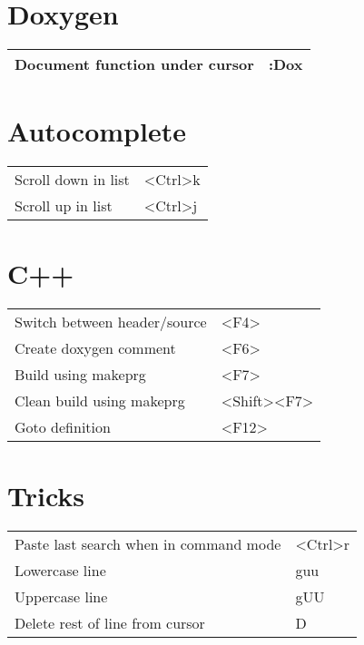 \documentclass[a4paper]{report}
\def \tablewidth {10cm}
\begin{document}
\section{Doxygen}
\begin{tabularx}{\tablewidth}{| X | l |}
  \hline
  Document function under cursor & :Dox \\
  \hline
\end{tabularx}

\section{Autocomplete}
\begin{tabularx}{\tablewidth}{| X | l |}
  \hline
  Scroll down in list & \textless Ctrl\textgreater k \\
  Scroll up in list & \textless Ctrl\textgreater j \\
  \hline
\end{tabularx}

\section{C++}
\begin{tabularx}{\tablewidth}{| X | l |}
  \hline
  Switch between header/source & \textless F4\textgreater \\
  Create doxygen comment & \textless F6\textgreater \\
  Build using makeprg & \textless F7\textgreater \\
  Clean build using makeprg & \textless Shift\textgreater \textless F7\textgreater \\
  Goto definition & \textless F12\textgreater \\
  \hline
\end{tabularx}

\section{Tricks}
\begin{tabularx}{\tablewidth}{| X | l |}
  \hline
  Paste last search when in command mode & \textless Ctrl\textgreater r \\
  Lowercase line & guu \\
  Uppercase line & gUU \\
  Delete rest of line from cursor & D \\
  \hline
\end{tabularx}
\end{document}
